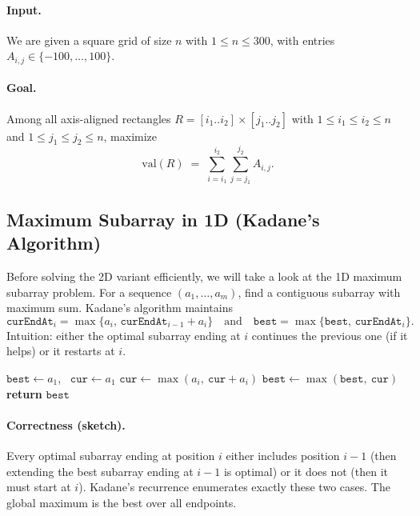 \documentclass[a4paper,12pt,headsepline]{scrartcl}
\begin{document}
\paragraph{Input.}
We are given a square grid of size $n$ with $1 \le n \le 300$, with entries $A_{i,j} \in \{-100,\ldots,100\}$.

\paragraph{Goal.}
Among all axis-aligned rectangles $R = [i_1..i_2] \times [j_1..j_2]$ with $1 \le i_1 \le i_2 \le n$ and $1 \le j_1 \le j_2 \le n$, maximize
\[
\mathrm{val}(R) \;=\; \sum_{i=i_1}^{i_2} \sum_{j=j_1}^{j_2} A_{i,j}.
\]

\subsection{Maximum Subarray in 1D (Kadane's Algorithm)}

Before solving the 2D variant efficiently, we will take a look at the 1D maximum subarray problem. For a sequence $(a_1,\ldots,a_m)$, find a contiguous subarray with maximum sum. Kadane's algorithm maintains
\[
\texttt{curEndAt}_i = \max\{a_i,\, \texttt{curEndAt}_{i-1} + a_i\}\quad\text{and}\quad
\texttt{best} = \max\{\texttt{best},\, \texttt{curEndAt}_i\}.
\]
Intuition: either the optimal subarray ending at $i$ continues the previous one (if it helps) or it restarts at $i$.

\begin{algorithm}
\caption{Kadane1D$(a_1,\ldots,a_m)$}
\begin{algorithmic}[1]
\State $\texttt{best} \gets a_1$, \ $\texttt{cur} \gets a_1$
  \State $\texttt{cur} \gets \max(a_i,\ \texttt{cur} + a_i)$
  \State $\texttt{best} \gets \max(\texttt{best},\ \texttt{cur})$
\EndFor
\State \textbf{return} $\texttt{best}$
\end{algorithmic}
\end{algorithm}

\paragraph{Correctness (sketch).}
Every optimal subarray ending at position $i$ either includes position $i-1$ (then extending the best subarray ending at $i-1$ is optimal) or it does not (then it must start at $i$). Kadane's recurrence enumerates exactly these two cases. The global maximum is the best over all endpoints.
\end{document}
